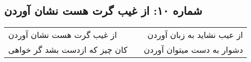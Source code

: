 \begin{center}
\section*{شماره ۱۰: از غیب گرت هست نشان آوردن}
\label{sec:010}
\begin{longtable}{l p{0.5cm} r}
از غیب گرت هست نشان آوردن
&&
از عیب نشاید به زبان آوردن
\\
کان چیز که ازدست بشد گر خواهی
&&
دشوار به دست میتوان آوردن
\\
\end{longtable}
\end{center}
